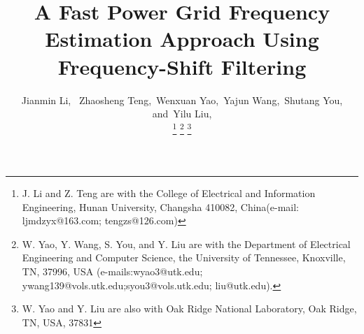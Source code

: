 \documentclass[journal,twoside]{IEEEtran}
\begin{document}
%
\title{A Fast Power Grid Frequency Estimation Approach Using Frequency-Shift Filtering}
%
%
%
\author{Jianmin Li,~
		Zhaosheng Teng,~Wenxuan Yao,~Yajun Wang,~Shutang You,
		and~Yilu Liu, %
		
			
		\thanks{J.  Li and Z. Teng are with the College of Electrical and Information Engineering, Hunan University, Changsha 410082, China(e-mail: ljmdzyx@163.com; tengzs@126.com)} %
		\thanks{W. Yao, Y. Wang, S. You, and Y. Liu are with the Department of Electrical Engineering and Computer Science, the University of Tennessee, Knoxville, TN, 37996, USA (e-mails:wyao3@utk.edu; ywang139@vols.utk.edu;syou3@vols.utk.edu; liu@utk.edu).}
		\thanks{W. Yao and Y. Liu are also with  Oak Ridge National Laboratory, Oak Ridge, TN, USA, 37831}
		}%

% 
%
\end{document}
